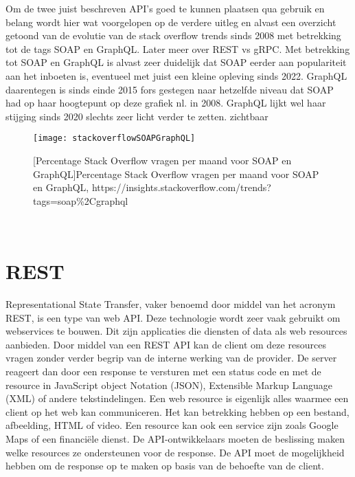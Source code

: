 Om de twee juist beschreven API's goed te kunnen plaatsen qua gebruik en belang wordt hier wat voorgelopen op de verdere uitleg en alvast een overzicht getoond van de evolutie van de
stack overflow trends sinds 2008 met betrekking tot de tags SOAP en GraphQL. Later meer over REST vs gRPC. Met betrekking tot SOAP en GraphQL is alvast zeer duidelijk dat SOAP eerder
aan populariteit aan het inboeten is, eventueel met juist een kleine opleving sinds 2022. GraphQL daarentegen is sinds einde 2015 fors gestegen naar hetzelfde niveau dat SOAP had
op haar hoogtepunt op deze grafiek nl. in 2008. GraphQL lijkt wel haar stijging sinds 2020 slechts zeer licht verder te zetten.
zichtbaar
\begin{figure}[ht]
    \centering
    \texttt{[image: stackoverflowSOAPGraphQL]}
    \caption{[Percentage Stack Overflow vragen per maand voor SOAP en GraphQL]Percentage Stack Overflow vragen per maand voor SOAP en GraphQL,\newline
    https://insights.stackoverflow.com/trends?tags=soap\%2Cgraphql}
\end{figure}\\
\nocite{stackoverflowSOAPGraphQL}

\section{REST}

Representational State Transfer, vaker benoemd door middel van het acronym REST, is een type van web API. Deze technologie wordt zeer vaak gebruikt om webservices te bouwen.
Dit zijn applicaties die diensten of data als web resources aanbieden. Door middel van een REST API kan de client om deze resources vragen zonder verder
begrip van de interne werking van de provider. De server reageert dan door een response te versturen met een status code en met de resource in JavaScript object Notation (JSON),
Extensible Markup Language (XML) of andere tekstindelingen. Een web resource is eigenlijk alles waarmee een client op het web kan communiceren.
Het kan betrekking hebben op een bestand, afbeelding, HTML of video. Een resource kan ook een service zijn zoals Google Maps of een financiële dienst.
De API-ontwikkelaars moeten de beslissing maken welke resources ze ondersteunen voor de response.
De API moet de mogelijkheid hebben om de response op te maken op basis van de behoefte van de client.
~\autocite{uptrends}
~\autocite{guru99-webservices}\\

